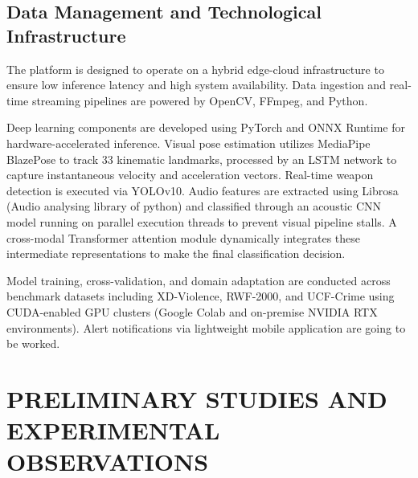 \documentclass[11pt,a4paper]{article}
\begin{document}
	\subsection{Data Management and Technological Infrastructure}
	The platform is designed to operate on a hybrid edge-cloud infrastructure to ensure low inference latency and high system availability. Data ingestion and real-time streaming pipelines are powered by OpenCV, FFmpeg, and Python.
	
	Deep learning components are developed using PyTorch and ONNX Runtime for hardware-accelerated inference. Visual pose estimation utilizes MediaPipe BlazePose to track 33 kinematic landmarks, processed by an LSTM network to capture instantaneous velocity and acceleration vectors. Real-time weapon detection is executed via YOLOv10. Audio features are extracted using Librosa (Audio analysing library of python) and classified through an acoustic CNN model running on parallel execution threads to prevent visual pipeline stalls. A cross-modal Transformer attention module dynamically integrates these intermediate representations to make the final classification decision.
	
	Model training, cross-validation, and domain adaptation are conducted across benchmark datasets including XD-Violence, RWF-2000, and UCF-Crime using CUDA-enabled GPU clusters (Google Colab and on-premise NVIDIA RTX environments). Alert notifications via lightweight mobile application are going to be worked.
	
	\section{PRELIMINARY STUDIES AND EXPERIMENTAL OBSERVATIONS}
	
\end{document}
